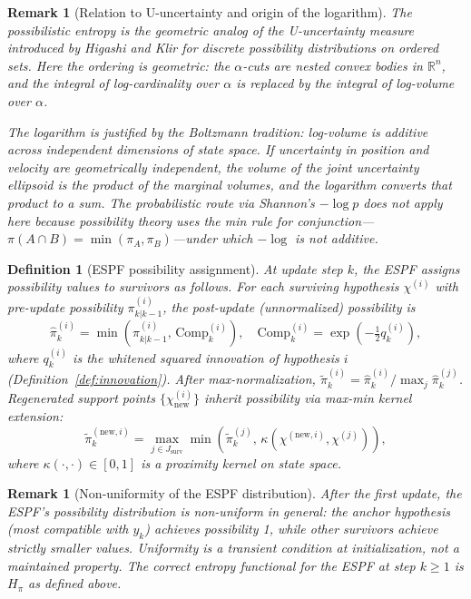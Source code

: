\documentclass[12pt]{article}
\newtheorem{definition}[theorem]{Definition}
\newtheorem{remark}[theorem]{Remark}
\begin{document}
\begin{remark}[Relation to U-uncertainty and origin of the logarithm]
The possibilistic entropy is
the geometric analog of the U-uncertainty measure introduced by Higashi and Klir \cite{higashi} for discrete
possibility distributions on ordered sets. Here the ordering is geometric: the $\alpha$-cuts are nested convex
bodies in $\mathbb{R}^n$, and the integral of log-cardinality over $\alpha$ is replaced by the integral of log-volume
over $\alpha$.

The logarithm is justified by the Boltzmann tradition: log-volume is additive across independent
dimensions of state space. If uncertainty in position and velocity are geometrically independent, the
volume of the joint uncertainty ellipsoid is the product of the marginal volumes, and the logarithm
converts that product to a sum. The probabilistic route via Shannon's $-\log p$ does not apply here
because possibility theory uses the min rule for conjunction---$\pi(A\cap B) = \min(\pi_A, \pi_B)$---under which
$-\log$ is not additive.
\end{remark}

\begin{definition}[ESPF possibility assignment]
At update step $k$, the ESPF assigns possibility
values to survivors as follows. For each surviving hypothesis $\chi^{(i)}$ with pre-update possibility $\pi^{(i)}_{k|k-1}$,
the post-update (unnormalized) possibility is
\begin{equation}
\hat{\pi}^{(i)}_k = \min\!\left(\pi^{(i)}_{k|k-1},\, \mathrm{Comp}^{(i)}_k\right),\quad \mathrm{Comp}^{(i)}_k = \exp\!\left(-\tfrac{1}{2}q^{(i)}_k\right),
\end{equation}
where $q^{(i)}_k$ is the whitened squared innovation of hypothesis $i$ (Definition~\ref{def:innovation}). After max-normalization,
$\tilde{\pi}^{(i)}_k = \hat{\pi}^{(i)}_k / \max_j \hat{\pi}^{(j)}_k$. Regenerated support points $\{\chi^{(i)}_{\mathrm{new}}\}$ inherit possibility via max-min kernel
extension:
\begin{equation}
\tilde{\pi}^{(\mathrm{new},i)}_k = \max_{j\in J_{\mathrm{surv}}} \min\!\left(\tilde{\pi}^{(j)}_k,\, \kappa(\chi^{(\mathrm{new},i)}, \chi^{(j)})\right),
\end{equation}
where $\kappa(\cdot,\cdot) \in [0,1]$ is a proximity kernel on state space.
\end{definition}

\begin{remark}[Non-uniformity of the ESPF distribution]
After the first update, the ESPF's possibility
distribution is non-uniform in general: the anchor hypothesis (most compatible with $y_k$) achieves
possibility 1, while other survivors achieve strictly smaller values. Uniformity is a transient condition
at initialization, not a maintained property. The correct entropy functional for the ESPF at step
$k \geq 1$ is $H_\pi$ as defined above.
\end{remark}
\end{document}
